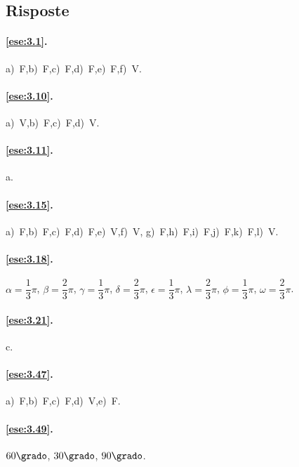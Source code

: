 \begin{multicols}{2}
\subsection{Risposte}

\begingroup
\hypersetup{linkcolor=black}

\paragraph{\ref{ese:3.1}.}
a)~F,\quad b)~F,\quad c)~F,\quad d)~F,\quad e)~F,\quad f)~V.

\paragraph{\ref{ese:3.10}.}
a)~V,\quad b)~F,\quad c)~F,\quad d)~V.

\paragraph{\ref{ese:3.11}.}
a.

\paragraph{\ref{ese:3.15}.}
a)~F,\quad b)~F,\quad c)~F,\quad d)~F,\quad e)~V,\quad f)~V,\quad 
g)~F,\quad h)~F,\quad i)~F,\quad j)~F,\quad k)~F,\quad l)~V.

\paragraph{\ref{ese:3.18}.}
$\alpha=\dfrac{1}{3}\pi$, $\beta=\dfrac{2}{3}\pi$, 
$\gamma=\dfrac{1}{3}\pi$, $\delta=\dfrac{2}{3}\pi$, 
$\epsilon=\dfrac{1}{3}\pi$, $\lambda=\dfrac{2}{3}\pi$, 
$\phi=\dfrac{1}{3}\pi$, $\omega=\dfrac{2}{3}\pi$.

\paragraph{\ref{ese:3.21}.}
c.

\paragraph{\ref{ese:3.47}.}
a)~F,\quad b)~F,\quad c)~F,\quad d)~V,\quad e)~F.

\paragraph{\ref{ese:3.49}.}
$60\grado$, $30\grado$, $90\grado$.


\end{multicols}
